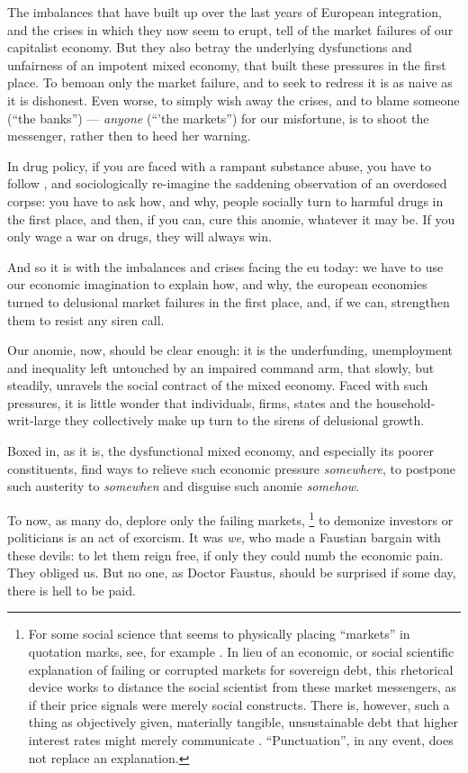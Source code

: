 The imbalances that have built up over the last years of European integration, and the crises in which they now seem to erupt, tell of the market failures of our capitalist economy.
But they also betray the underlying dysfunctions and unfairness of an impotent mixed economy, that built these pressures in the first place.
To bemoan only the market failure, and to seek to redress it is as naive as it is dishonest.
Even worse, to simply wish away the crises, and to blame someone (``the banks'') --- \emph{anyone} (``'the markets'') for our misfortune, is to shoot the messenger, rather then to heed her warning.

In drug policy, if you are faced with a rampant substance abuse, you have to follow \cite{Mills-1959-aa}, and sociologically re-imagine the saddening observation of an overdosed corpse:
you have to ask how, and why, people socially turn to harmful drugs in the first place, and then, if you can, cure this anomie, whatever it may be.
If you only wage a war on drugs, they will always win.

And so it is with the imbalances and crises facing the \gls{eu} today:
we have to use our economic imagination to explain how, and why, the european economies turned to delusional market failures in the first place, and, if we can, strengthen them to resist any siren call.

Our anomie, now, should be clear enough:
it is the underfunding, unemployment and inequality left untouched by an impaired command arm, that slowly, but steadily, unravels the social contract of the mixed economy.
Faced with such pressures, it is little wonder that individuals, firms, states and the household-writ-large they collectively make up turn to the sirens of delusional growth.

Boxed in, as it is, the dysfunctional mixed economy, and especially its poorer constituents, find ways to relieve such economic pressure \emph{somewhere}, to postpone such austerity to \emph{somewhen} and disguise such anomie \emph{somehow}.

To now, as many do, deplore only the failing markets,
\footnote{
	For some social science that seems to physically placing ``markets'' in quotation marks, see, for example \citealt{Beckert2012}.
	In lieu of an economic, or social scientific explanation of failing or corrupted markets for sovereign debt, this rhetorical device works to distance the social scientist from these market messengers, as if their price signals were merely social constructs.
	There is, however, such a thing as objectively given, materially tangible, unsustainable debt that higher interest rates might merely communicate \citep[55]{Wihlborg2010}.
	``Punctuation'', in any event, does not replace an explanation.
}
to demonize investors or politicians is an act of exorcism.
It was \emph{we}, who made a Faustian bargain with these devils:
to let them reign free, if only they could numb the economic pain.
They obliged us.
But no one, as Doctor Faustus, should be surprised if some day, there is hell to be paid.

